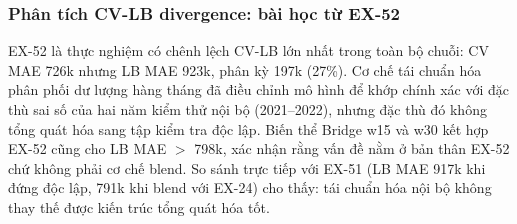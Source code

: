\documentclass{article}
\begin{document}
\subsubsection{Phân tích CV-LB divergence: bài học từ EX-52}

EX-52 là thực nghiệm có chênh lệch CV-LB lớn nhất trong toàn bộ chuỗi: CV MAE 726k nhưng LB MAE 923k, phân kỳ 197k (27\%). Cơ chế tái chuẩn hóa phân phối dư lượng hàng tháng đã điều chỉnh mô hình để khớp chính xác với đặc thù sai số của hai năm kiểm thử nội bộ (2021--2022), nhưng đặc thù đó không tổng quát hóa sang tập kiểm tra độc lập. Biến thể Bridge w15 và w30 kết hợp EX-52 cũng cho LB MAE $>$ 798k, xác nhận rằng vấn đề nằm ở bản thân EX-52 chứ không phải cơ chế blend. So sánh trực tiếp với EX-51 (LB MAE 917k khi đứng độc lập, 791k khi blend với EX-24) cho thấy: tái chuẩn hóa nội bộ không thay thế được kiến trúc tổng quát hóa tốt.
\end{document}
